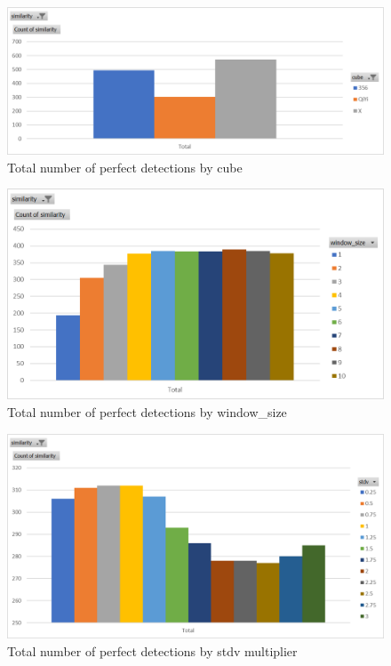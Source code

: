 \begin{figure}[h]
    \centering
    \caption{Total number of perfect detections by cube}
    \label{fig:perfect-detections-by-cube}
    \includegraphics[width=0.75\linewidth]{Figures/7 Evaluation/perfect_detections_by_cube.png}
\end{figure}

\begin{figure}[h]
    \centering
    \caption{Total number of perfect detections by window\_size}
    \label{fig:perfect-detections-by-window-size}
    \includegraphics[width=0.75\linewidth]{Figures/7 Evaluation/perfect_detections_by_window_size.png}
\end{figure}

\begin{figure}[h]
    \centering
    \caption{Total number of perfect detections by stdv multiplier}
    \label{fig:perfect-detections-by-stdv}
    \includegraphics[width=0.75\linewidth]{Figures/7 Evaluation/perfect_detections_by_stdv.png}
\end{figure}

